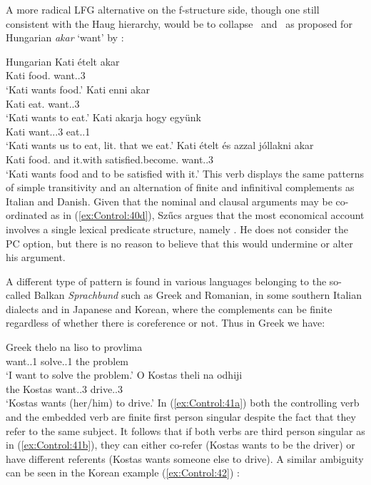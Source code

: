 \documentclass[output=paper,hidelinks]{langscibook}
\begin{document}
A more radical LFG alternative on the f-structure side, though one still consistent with the Haug hierarchy, would be to collapse \COMP\ and \OBJ\ as proposed for Hungarian \emph{akar} `want' by \citet{Szucs2018}:

\ea\label{ex:Control:40}Hungarian
\ea\label{ex:Control:40a} \gll Kati {\'e}telt   akar\\
 Kati  {food.\ACC} want.\PRS.3\SG\\
\glt `Kati wants food.'
\ex\label{ex:Control:40b} \gll Kati enni  akar\\
    Kati  {eat.\INF} want.\PRS.3\SG\\
\glt    `Kati wants to eat.'
\ex\label{ex:Control:40c} \gll Kati akarja     hogy  egy{\"u}nk\\
    Kati  {want.\PRS.\DEF.3\SG}    eat.\SBJV.1\PL\\
\glt    `Kati wants us to eat, lit. that we eat.'
\ex\label{ex:Control:40d} \gll Kati {\'e}telt   {\'e}s  azzal   jóllakni      akar\\
    Kati  {food.\ACC} and it.with  {satisfied.become.\INF}  want.\PRS.3\SG\\
\glt    `Kati wants food and to be satisfied with it.' 
\z\z
This verb displays the same patterns of simple transitivity and an alternation of finite and infinitival complements as Italian and Danish. Given that the nominal and clausal arguments may be co-ordinated as in (\ref{ex:Control:40d}), Sz\H{u}cs argues that the most economical account involves a single lexical predicate structure, namely \arglist{(\SUBJ)(\OBJ)}. He does not consider the PC option, but there is no reason to believe that this would undermine or alter his argument.

A different type of pattern is found in various languages belonging to the so-called Balkan \emph{Sprachbund} such as Greek and Romanian, in some southern Italian dialects and in Japanese and Korean, where the complements can be finite regardless of whether there is coreference or not. Thus in Greek we have:

\ea\label{ex:Control:41}Greek
\ea\label{ex:Control:41a} \gll thelo    na  liso     to  provlima\\
{want.\PRS.1\SG}  {solve.\PRS.1\SG}  the problem\\
\glt`I want to solve the problem.'
\ex\label{ex:Control:41b} \gll O  Kostas theli    na  odhiji\\
 the Kostas   {want.\PRS.3\SG}  drive.\PRS.3\SG\\
\glt `Kostas wants (her/him) to drive.'
\z\z
In (\ref{ex:Control:41a}) both the controlling verb and the embedded verb are finite first person singular despite the fact that they refer to the same subject. It follows that if both verbs are third person singular as in (\ref{ex:Control:41b}), they can either co-refer (Kostas wants to be the driver) or have different referents (Kostas wants someone else to drive). A similar ambiguity can be seen in the Korean example (\ref{ex:Control:42}) \citep[112]{Lee2009}:
\end{document}
